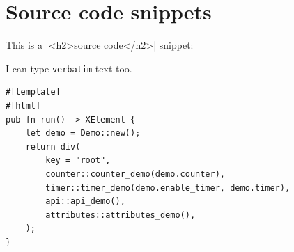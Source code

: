 \documentclass[11pt,parskip=half]{scrartcl}
\begin{document}
\section{Source code snippets}

This is a |<h2>source code</h2>| snippet:

I can type \texttt{verbatim} text too.

\begin{listing}[H]
  \begin{verbatim}
#[template]
#[html]
pub fn run() -> XElement {
    let demo = Demo::new();
    return div(
        key = "root",
        counter::counter_demo(demo.counter),
        timer::timer_demo(demo.enable_timer, demo.timer),
        api::api_demo(),
        attributes::attributes_demo(),
    );
}
\end{verbatim}
  \caption{Some Rust code}
  \label{listing:rust}
\end{listing}
\end{document}
